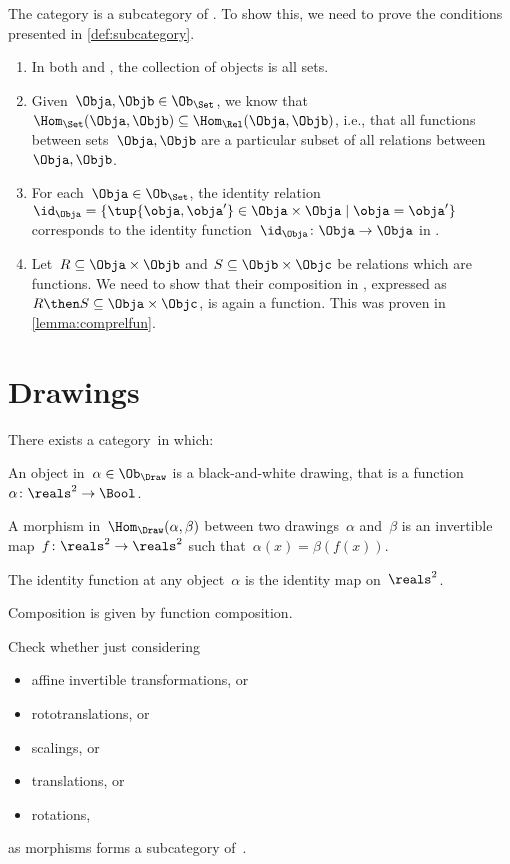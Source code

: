 \begin{example}
    The category \Set is a subcategory of \Rel. To show this, we need to prove the conditions presented in \cref{def:subcategory}.
	\begin{enumerate}
	\item In both \Rel and \Set, the collection of objects is all sets.
	\item Given~$\Obja,\Objb\in \Ob_{\Set}$, we know that~$\Hom_{\Set}(\Obja,\Objb)\subseteq \Hom_{\Rel}(\Obja,\Objb)$, i.e., that all functions between sets~$\Obja,\Objb$ are a particular subset of all relations between~$\Obja,\Objb$.
	\item For each~$\Obja \in \Ob_{\Set}$, the identity relation~$\id_\Obja=\{\tup{\obja,\obja'}\in \Obja\times \Obja \mid \obja=\obja'\}$ corresponds to the identity function~$\id_\Obja \colon \Obja \to \Obja$ in \Set.
	\item Let~$R\subseteq \Obja\times \Objb$ and $S\subseteq \Objb \times \Objc$ be relations which are functions. We need to show that their composition in \Rel, expressed as~$R\then S\subseteq \Obja\times \Objc$, is again a function. This was proven in \cref{lemma:comprelfun}.
	\end{enumerate}

\end{example}


\section{Drawings}

\begin{definition}[Drawings]
There exists a category~\Draw in which:
\begin{compactenum}
\item An object in~$\alpha\in \Ob_\Draw$ is a black-and-white drawing,
that is a function~$\alpha \colon \reals^2 \to \Bool$.
\item A morphism in~$\Hom_{\Draw}(\alpha, \beta)$ between two drawings~$\alpha$ and~$\beta$ is an invertible map~$f\colon \reals^2 \to \reals^2$ such that~$\alpha(x) = \beta(f(x))$.
\item The identity function at any object~$\alpha$ is the identity map
on~$\reals^2$.
\item Composition is given by function composition.
\end{compactenum}
\end{definition}

\begin{exercise}
Check whether just considering
    \begin{itemize}
        \item affine invertible transformations, or
        \item rototranslations, or
        \item scalings, or
        \item translations, or
        \item rotations,
    \end{itemize}
as morphisms forms a subcategory of~\Draw.
 \end{exercise}

